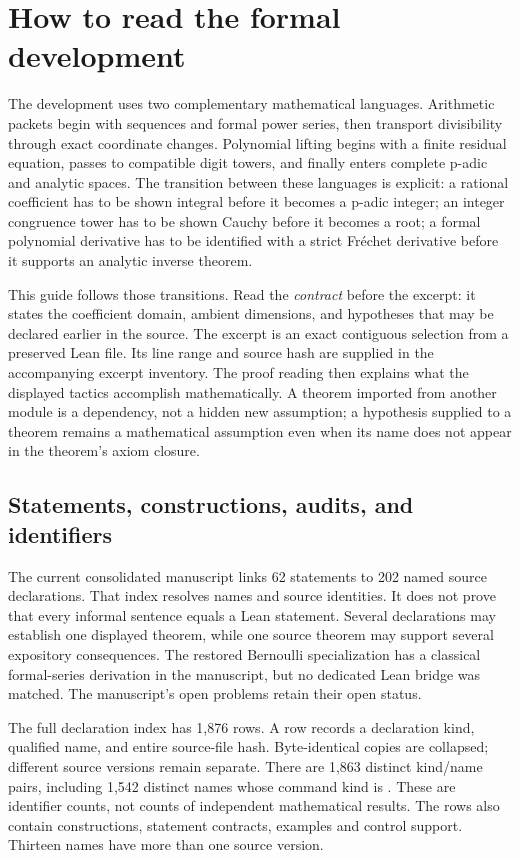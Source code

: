\section{How to read the formal development}\label{sec:reading}
The development uses two complementary mathematical languages. Arithmetic packets begin with sequences and formal power series, then transport divisibility through exact coordinate changes. Polynomial lifting begins with a finite residual equation, passes to compatible digit towers, and finally enters complete p-adic and analytic spaces. The transition between these languages is explicit: a rational coefficient has to be shown integral before it becomes a p-adic integer; an integer congruence tower has to be shown Cauchy before it becomes a root; a formal polynomial derivative has to be identified with a strict Fr\'echet derivative before it supports an analytic inverse theorem.

This guide follows those transitions. Read the \emph{contract} before the excerpt: it states the coefficient domain, ambient dimensions, and hypotheses that may be declared earlier in the source. The excerpt is an exact contiguous selection from a preserved Lean file. Its line range and source hash are supplied in the accompanying excerpt inventory. The proof reading then explains what the displayed tactics accomplish mathematically. A theorem imported from another module is a dependency, not a hidden new assumption; a hypothesis supplied to a theorem remains a mathematical assumption even when its name does not appear in the theorem's axiom closure.

\subsection{Statements, constructions, audits, and identifiers}
The current consolidated manuscript links 62 statements to 202 named source declarations. That index resolves names and source identities. It does not prove that every informal sentence equals a Lean statement. Several declarations may establish one displayed theorem, while one source theorem may support several expository consequences. The restored Bernoulli specialization has a classical formal-series derivation in the manuscript, but no dedicated Lean bridge was matched. The manuscript's open problems retain their open status.

The full declaration index has 1,876 rows. A row records a declaration kind, qualified name, and entire source-file hash. Byte-identical copies are collapsed; different source versions remain separate. There are 1,863 distinct kind/name pairs, including 1,542 distinct names whose command kind is . These are identifier counts, not counts of independent mathematical results. The rows also contain constructions, statement contracts, examples and control support. Thirteen names have more than one source version.


